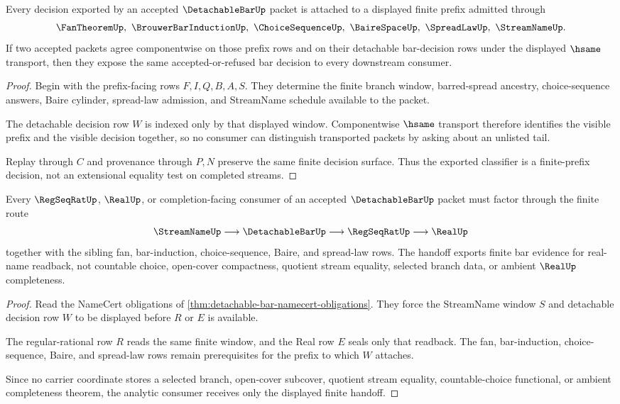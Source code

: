 \begin{theorem}
\label{thm:detachable-bar-finite-prefix-decision}
Every decision exported by an accepted $\DetachableBarUp$ packet is attached to a displayed finite prefix admitted through
$$
\FanTheoremUp,\ \BrouwerBarInductionUp,\ \ChoiceSequenceUp,\ \BaireSpaceUp,\ \SpreadLawUp,\ \StreamNameUp.
$$
If two accepted packets agree componentwise on those prefix rows and on their detachable bar-decision rows under the displayed $\hsame$ transport, then they expose the same accepted-or-refused bar decision to every downstream consumer.
\end{theorem}
\begin{proof}
Begin with the prefix-facing rows $F,I,Q,B,A,S$. They determine the finite branch window, barred-spread ancestry, choice-sequence answers, Baire cylinder, spread-law admission, and StreamName schedule available to the packet.

The detachable decision row $W$ is indexed only by that displayed window. Componentwise $\hsame$ transport therefore identifies the visible prefix and the visible decision together, so no consumer can distinguish transported packets by asking about an unlisted tail.

Replay through $C$ and provenance through $P,N$ preserve the same finite decision surface. Thus the exported classifier is a finite-prefix decision, not an extensional equality test on completed streams.
\end{proof}

\begin{theorem}
\label{thm:detachable-bar-real-completion-handoff}
Every $\RegSeqRatUp$, $\RealUp$, or completion-facing consumer of an accepted $\DetachableBarUp$ packet must factor through the finite route
$$
\StreamNameUp \longrightarrow \DetachableBarUp \longrightarrow \RegSeqRatUp \longrightarrow \RealUp
$$
together with the sibling fan, bar-induction, choice-sequence, Baire, and spread-law rows. The handoff exports finite bar evidence for real-name readback, not countable choice, open-cover compactness, quotient stream equality, selected branch data, or ambient $\RealUp$ completeness.
\end{theorem}
\begin{proof}
Read the NameCert obligations of \autoref{thm:detachable-bar-namecert-obligations}. They force the StreamName window $S$ and detachable decision row $W$ to be displayed before $R$ or $E$ is available.

The regular-rational row $R$ reads the same finite window, and the Real row $E$ seals only that readback. The fan, bar-induction, choice-sequence, Baire, and spread-law rows remain prerequisites for the prefix to which $W$ attaches.

Since no carrier coordinate stores a selected branch, open-cover subcover, quotient stream equality, countable-choice functional, or ambient completeness theorem, the analytic consumer receives only the displayed finite handoff.
\end{proof}

